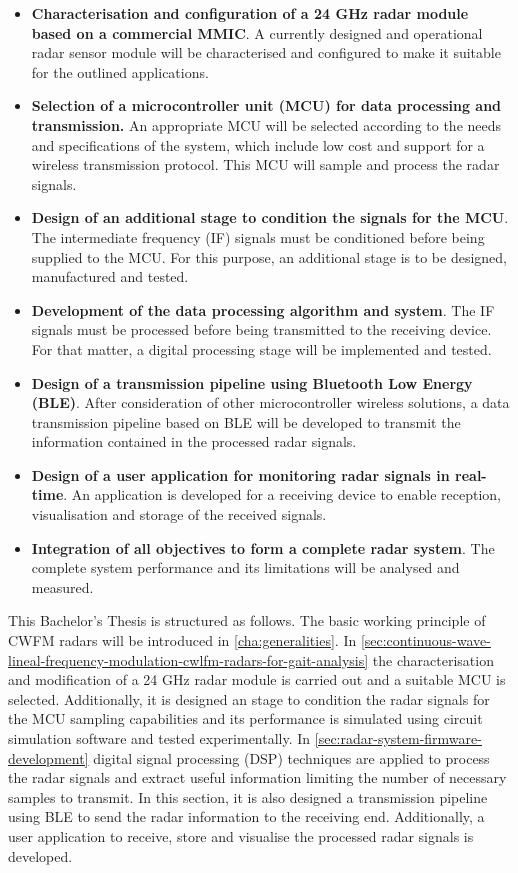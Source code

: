 	\begin{itemize}
		\item \textbf{Characterisation and configuration of a 24 GHz radar module based on a commercial MMIC}. A currently designed and operational radar sensor module will be characterised and configured to make it suitable for the outlined applications.

		\item \textbf{Selection of a microcontroller unit (MCU) for data processing and transmission.} An appropriate MCU will be selected according to the needs and specifications of the system, which include low cost and support for a wireless transmission protocol. This MCU will sample and process the radar signals.

		\item \textbf{Design of an additional stage to condition the signals for the MCU}. The intermediate frequency (IF) signals must be conditioned before being supplied to the MCU. For this purpose, an additional stage is to be designed, manufactured and tested.

		\item \textbf{Development of the data processing algorithm and system}. The IF signals must be processed before being transmitted to the receiving device. For that matter, a digital processing stage will be implemented and tested.

		\item \textbf{Design of a transmission pipeline using Bluetooth Low Energy (BLE)}. After consideration of other microcontroller wireless solutions, a data transmission pipeline based on BLE will be developed to transmit the information contained in the processed radar signals.

		\item \textbf{Design of a user application for monitoring radar signals in real-time}. An application is developed for a receiving device to enable reception, visualisation and storage of the received signals.

		\item \textbf{Integration of all objectives to form a complete radar system}. The complete system performance and its limitations will be analysed and measured.
	\end{itemize}

	This Bachelor's Thesis is structured as follows. The basic working principle of CWFM radars will be introduced in \cref{cha:generalities}. In \cref{sec:continuous-wave-lineal-frequency-modulation-cwlfm-radars-for-gait-analysis} the characterisation and modification of a 24 GHz radar module is carried out and a suitable MCU is selected. Additionally, it is designed an stage to condition the radar signals for the MCU sampling capabilities and its performance is simulated using circuit simulation software and tested experimentally. In \cref{sec:radar-system-firmware-development} digital signal processing (DSP) techniques are applied to process the radar signals and extract useful information limiting the number of necessary samples to transmit. In this section, it is also designed a transmission pipeline using BLE to send the radar information to the receiving end. Additionally, a user application to receive, store and visualise the processed radar signals is developed.